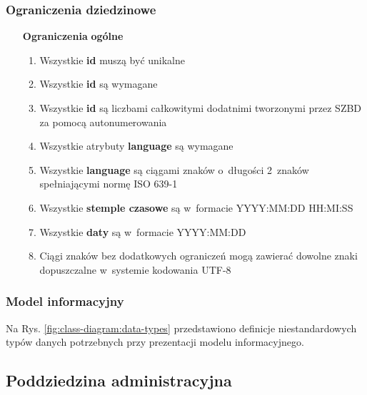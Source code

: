 \subsubsection{Ograniczenia dziedzinowe}\label{subsubsec:database:domain:restrictions}

\begin{itemize}[label={\textbf{Ograniczenia dla}}, wide, labelwidth=!, labelindent=0pt]
    \setlength\itemsep{1.75em}
    \item[\textbf{Ograniczenia}] \textbf{ogólne}
    \begin{enumerate}[label={\textbf{OGR/0/\protect\twodigits{\arabic{enumi}}}}, wide, labelwidth=!, align=left, leftmargin=3cm]
        \item Wszystkie \textbf{id} muszą być unikalne
        \item Wszystkie \textbf{id} są wymagane
        \item Wszystkie \textbf{id} są liczbami całkowitymi dodatnimi tworzonymi przez SZBD za pomocą autonumerowania
        \item Wszystkie atrybuty \textbf{language} są wymagane
        \item Wszystkie \textbf{language} są ciągami znaków o~długości 2~znaków spełniającymi normę ISO 639-1
        \item Wszystkie \textbf{stemple czasowe} są w~formacie YYYY:MM:DD HH:MI:SS
        \item Wszystkie \textbf{daty} są w~formacie YYYY:MM:DD
        \item Ciągi znaków bez dodatkowych ograniczeń mogą zawierać dowolne znaki dopuszczalne w~systemie kodowania UTF-8
    \end{enumerate}
\end{itemize}

\subsubsection{Model informacyjny}\label{subsubsec:database:domain:domainModel}
Na Rys. \ref{fig:class-diagram:data-types} przedstawiono definicje niestandardowych typów danych potrzebnych przy prezentacji modelu informacyjnego.


\subsection{Poddziedzina administracyjna}\label{subsec:database:gateway}

